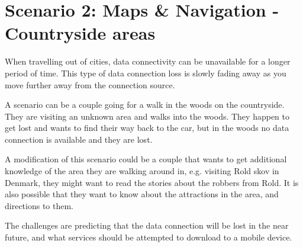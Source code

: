 \section{Scenario 2: Maps \& Navigation - Countryside areas}
When travelling out of cities, data connectivity can be unavailable for a longer period of time. This type of data connection loss is slowly fading away as you move further away from the connection source.

A scenario can be a couple going for a walk in the woods on the countryside. They are visiting an unknown area and walks into the woods. They happen to get lost and wants to find their way back to the car, but in the woods no data connection is available and they are lost.

A modification of this scenario could be a couple that wants to get additional knowledge of the area they are walking around in, e.g. visiting Rold skov in Denmark, they might want to read the stories about the robbers from Rold. It is also possible that they want to know about the attractions in the area, and directions to them.

The challenges are predicting that the data connection will be lost in the near future, and what services should be attempted to download to a mobile device. 
